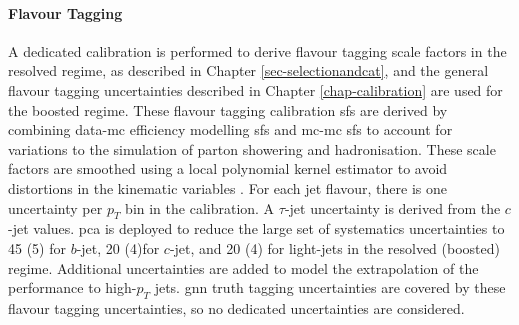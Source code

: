 \paragraph{Flavour Tagging} A dedicated calibration is performed to derive flavour tagging scale factors in the resolved regime, as described in Chapter \ref{sec-selectionandcat}, and the general flavour tagging uncertainties described in Chapter \ref{chap-calibration} are used for the boosted regime. These flavour tagging calibration \glspl{sf} are derived by combining data-\gls{mc} efficiency modelling \glspl{sf} and \gls{mc}-\gls{mc} \glspl{sf} to account for variations to the simulation of parton showering and hadronisation. These scale factors are smoothed using a local polynomial kernel estimator to avoid distortions in the kinematic variables \cite{ATL-PHYS-PUB-2020-004}. For each jet flavour, there is one uncertainty per $p_T$ bin in the calibration. A $\tau$-jet uncertainty is derived from the $c$-jet values. \gls{pca} is deployed to reduce the large set of systematics uncertainties to 45 (5) for $b$-jet, 20 (4)for $c$-jet, and 20 (4) for light-jets in the resolved (boosted) regime. Additional uncertainties are added to model the extrapolation of the performance to high-$p_T$ jets. \gls{gnn} truth tagging uncertainties are covered by these flavour tagging uncertainties, so no dedicated uncertainties are considered.


